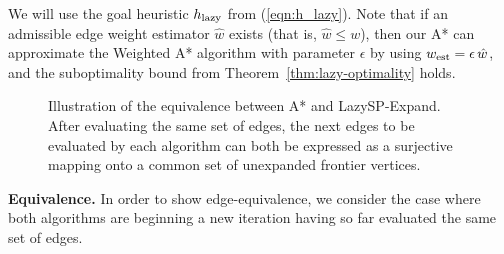 We will use the goal heuristic $h_{\mbox{\scriptsize lazy}}$ from (\ref{eqn:h_lazy}).
Note that if an admissible edge weight estimator $\hat{w}$ exists
(that is, $\hat{w} \leq w$),
then our A* can approximate the Weighted A* algorithm
\citep{pohl1970weightedastar}
with parameter $\epsilon$
by using $w_{\mbox{\scriptsize est}} = \epsilon \, \hat{w}$,
and the suboptimality bound from
Theorem~\ref{thm:lazy-optimality} holds.

\begin{figure}[t]
   \centering
   \caption{Illustration of the equivalence
      between A* and LazySP-Expand.
      After evaluating the same set of edges,
      the next edges to be evaluated by each algorithm
      can both be expressed as a surjective mapping onto
      a common set of unexpanded
      frontier vertices.
      }
   \label{fig:astar-equiv-mapping}
\end{figure}

\textbf{Equivalence.}
In order to show edge-equivalence,
we consider the case where both algorithms
are beginning a new iteration
having so far evaluated the same set of edges.

